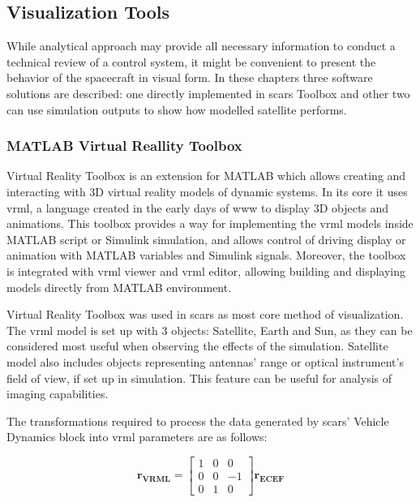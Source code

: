 \subsection{Visualization Tools}\label{sec:visualization}
    While analytical approach may provide all necessary information to conduct a technical review of a control system, it might be convenient to present the behavior of the spacecraft in visual form. In these chapters three software solutions are described: one directly implemented in \ac{scars} Toolbox and other two can use simulation outputs to show how modelled satellite performs.
    
    \subsubsection{MATLAB Virtual Reallity Toolbox}
        Virtual Reality Toolbox is an extension for MATLAB which allows creating and interacting with 3D virtual reality models of dynamic systems. In its core it uses \ac{vrml}, a language created in the early days of \ac{www} to display 3D objects and animations. This toolbox provides a way for implementing the \ac{vrml} models inside MATLAB script or Simulink simulation, and allows control of driving display or animation with MATLAB variables and Simulink signals. Moreover, the toolbox is integrated with \ac{vrml} viewer and \ac{vrml} editor, allowing building and displaying models directly from MATLAB environment.

        Virtual Reality Toolbox was used in \ac{scars} as most core method of visualization. The \ac{vrml} model is set up with 3 objects: Satellite, Earth and Sun, as they can be considered most useful when observing the effects of the simulation. Satellite model also includes objects representing antennas' range or optical instrument's field of view, if set up in simulation. This feature can be useful for analysis of imaging capabilities.

        The transformations required to process the data generated by \ac{scars}' Vehicle Dynamics block into \ac{vrml} parameters are as follows:
        
        \begin{equation}
            \mathbf{r_{VRML}}=
            \begin{bmatrix}
            1&0&0\\ 
            0&0&-1\\ 
            0&1&0
            \end{bmatrix}
            \mathbf{r_{ECEF}}
        \end{equation}
        
